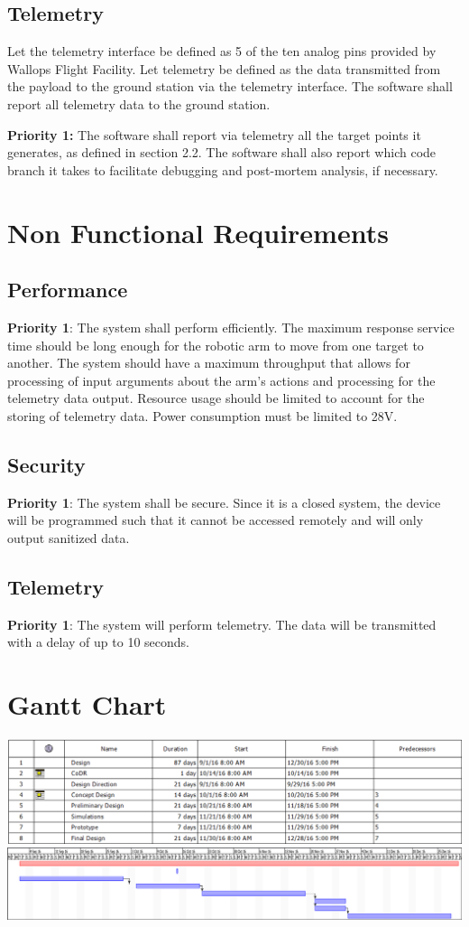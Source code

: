 \documentclass[letterpaper,10pt]{article}
\begin{document}
\subsection{Telemetry}
Let the telemetry interface be defined as 5 of the ten analog pins provided by Wallops Flight Facility.
Let telemetry be defined as the data transmitted from the payload to the ground station via the telemetry interface.
The software shall report all telemetry data to the ground station.

\textbf{Priority 1:}
The software shall report via telemetry all the target points it generates, as defined in section 2.2.
The software shall also report which code branch it takes to facilitate debugging and post-mortem analysis, if necessary. 

\section{Non Functional Requirements}
\subsection{Performance}
\textbf{Priority 1}: The system shall perform efficiently. The maximum response service time should be long enough for the robotic arm to move from one target to another.
 The system should have a maximum throughput that allows for processing of input arguments about the arm's actions and processing for the telemetry data output. 
 Resource usage should be limited to account for the storing of telemetry data. Power consumption must be limited to 28V.
\subsection{Security}
\textbf{Priority 1}: The system shall be secure. Since it is a closed system, the device will be programmed such that it cannot be accessed remotely and will only output sanitized data.
\subsection{Telemetry}
\textbf{Priority 1}: The system will perform telemetry. The data will be transmitted with a delay of up to 10 seconds.

\section{Gantt Chart}
\includegraphics[width=\textwidth]{gantttable}
\includegraphics[width=\textwidth]{ganttchart}
\end{document}
